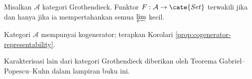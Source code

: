 \begin{korolari}\label{prop:Grothendieck-cat-rep2}
	Misalkan $\mathcal{A}$ kategori Grothendieck. Funktor
	$F:\mathcal{A}\to\cate{Set}$ terwakili jika dan hanya jika ia
	mempertahankan semua $\varprojlim$ kecil.
\end{korolari}
\begin{bukti}
	Kategori $\mathcal{A}$ mempunyai kogenerator; terapkan Korolari
	\ref{prop:cogenerator-representability}.
\end{bukti}

Karakterisasi lain dari kategori Grothendieck diberikan oleh Teorema
Gabriel--Popescu--Kuhn  dalam lampiran buku ini.

